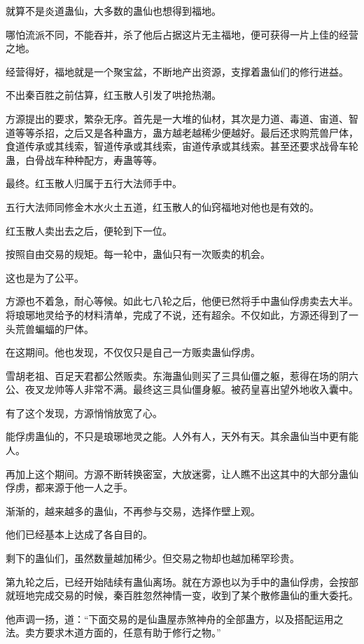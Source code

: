 \begin{this_body}
就算不是炎道蛊仙，大多数的蛊仙也想得到福地。

哪怕流派不同，不能吞并，杀了他后占据这片无主福地，便可获得一片上佳的经营之地。

经营得好，福地就是一个聚宝盆，不断地产出资源，支撑着蛊仙们的修行进益。

不出秦百胜之前估算，红玉散人引发了哄抢热潮。

方源提出的要求，繁杂无序。首先是一大堆的仙材，其次是力道、毒道、宙道、智道等等杀招，之后又是各种蛊方，蛊方越老越稀少便越好。最后还求购荒兽尸体，食道传承或其线索，智道传承或其线索，宙道传承或其线索。甚至还要求战骨车轮蛊，白骨战车种种配方，寿蛊等等。

最终。红玉散人归属于五行大法师手中。

五行大法师同修金木水火土五道，红玉散人的仙窍福地对他也是有效的。

红玉散人卖出去之后，便轮到下一位。

按照自由交易的规矩。每一轮中，蛊仙只有一次贩卖的机会。

这也是为了公平。

方源也不着急，耐心等候。如此七八轮之后，他便已然将手中蛊仙俘虏卖去大半。将琅琊地灵给予的材料清单，完成了不说，还有超余。不仅如此，方源还得到了一头荒兽蝙蝠的尸体。

在这期间。他也发现，不仅仅只是自己一方贩卖蛊仙俘虏。

雪胡老祖、百足天君都公然贩卖。东海蛊仙则买了三具仙僵之躯，惹得在场的阴六公、夜叉龙帅等人非常不满。最终这三具仙僵身躯。被药皇喜出望外地收入囊中。

有了这个发现，方源悄悄放宽了心。

能俘虏蛊仙的，不只是琅琊地灵之能。人外有人，天外有天。其余蛊仙当中更有能人。

再加上这个期间。方源不断转换密室，大放迷雾，让人瞧不出这其中的大部分蛊仙俘虏，都来源于他一人之手。

渐渐的，越来越多的蛊仙，不再参与交易，选择作壁上观。

他们已经基本上达成了各自目的。

剩下的蛊仙们，虽然数量越加稀少。但交易之物却也越加稀罕珍贵。

第九轮之后，已经开始陆续有蛊仙离场。就在方源也以为手中的蛊仙俘虏，会按部就班地完成交易的时候，秦百胜忽然神情一变，收到了某个散修蛊仙的重大委托。

他声调一扬，道：“下面交易的是仙蛊屋赤煞神舟的全部蛊方，以及搭配运用之法。卖方要求木道方面的，任意有助于修行之物。”


\end{this_body}
